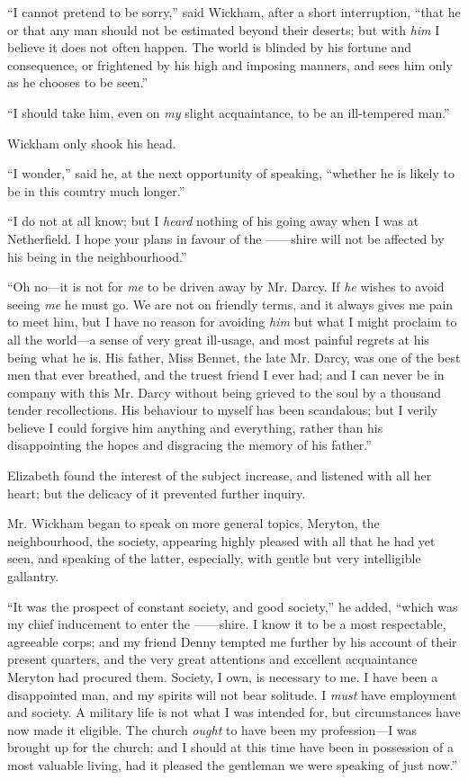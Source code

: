 \documentclass[12pt,openright]{book}
\begin{document}
“I cannot pretend to be sorry,” said Wickham, after a short interruption, “that he or that any man should not be estimated beyond their deserts; but with \textit{him} I believe it does not often happen. The world is blinded by his fortune and consequence, or frightened by his high and imposing manners, and sees him only as he chooses to be seen.”

“I should take him, even on \textit{my} slight acquaintance, to be an ill-tempered man.”

Wickham only shook his head.

“I wonder,” said he, at the next opportunity of speaking, “whether he is likely to be in this country much longer.”

“I do not at all know; but I \textit{heard} nothing of his going away when I was at Netherfield. I hope your plans in favour of the ——shire will not be affected by his being in the neighbourhood.”

“Oh no—it is not for \textit{me} to be driven away by Mr. Darcy. If \textit{he} wishes to avoid seeing \textit{me} he must go. We are not on friendly terms, and it always gives me pain to meet him, but I have no reason for avoiding \textit{him} but what I might proclaim to all the world—a sense of very great ill-usage, and most painful regrets at his being what he is. His father, Miss Bennet, the late Mr. Darcy, was one of the best men that ever breathed, and the truest friend I ever had; and I can never be in company with this Mr. Darcy without being grieved to the soul by a thousand tender recollections. His behaviour to myself has been scandalous; but I verily believe I could forgive him anything and everything, rather than his disappointing the hopes and disgracing the memory of his father.”

Elizabeth found the interest of the subject increase, and listened with all her heart; but the delicacy of it prevented further inquiry.

Mr. Wickham began to speak on more general topics, Meryton, the neighbourhood, the society, appearing highly pleased with all that he had yet seen, and speaking of the latter, especially, with gentle but very intelligible gallantry.

“It was the prospect of constant society, and good society,” he added, “which was my chief inducement to enter the ——shire. I know it to be a most respectable, agreeable corps; and my friend Denny tempted me further by his account of their present quarters, and the very great attentions and excellent acquaintance Meryton had procured them. Society, I own, is necessary to me. I have been a disappointed man, and my spirits will not bear solitude. I \textit{must} have employment and society. A military life is not what I was intended for, but circumstances have now made it eligible. The church \textit{ought} to have been my profession—I was brought up for the church; and I should at this time have been in possession of a most valuable living, had it pleased the gentleman we were speaking of just now.”
\end{document}
